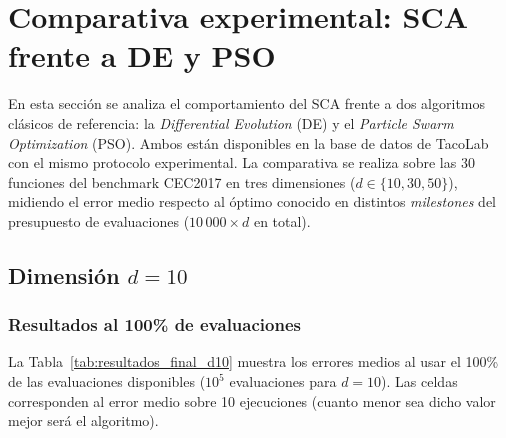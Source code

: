 \documentclass[12pt,a4paper]{article}
\begin{document}
\section{Comparativa experimental: SCA frente a DE y PSO}
\label{sec:exp_sca}
 
En esta sección se analiza el comportamiento del SCA frente a dos algoritmos clásicos de referencia: la \textit{Differential Evolution} (DE) y el \textit{Particle Swarm Optimization} (PSO). Ambos están disponibles en la base de datos de TacoLab~\cite{tacolab} con el mismo protocolo experimental. La comparativa se realiza sobre las 30 funciones del benchmark CEC2017 en tres dimensiones ($d \in \{10, 30, 50\}$), midiendo el error medio respecto al óptimo conocido en distintos \textit{milestones} del presupuesto de evaluaciones ($10\,000 \times d$ en total).
 
\subsection{Dimensión $d = 10$}
 
\subsubsection{Resultados al 100\% de evaluaciones}
 
La Tabla~\ref{tab:resultados_final_d10} muestra los errores medios al usar el 100\% de las evaluaciones disponibles ($10^5$ evaluaciones para $d=10$). Las celdas corresponden al error medio sobre 10 ejecuciones (cuanto menor sea dicho valor mejor será el algoritmo).
 
\end{document}
